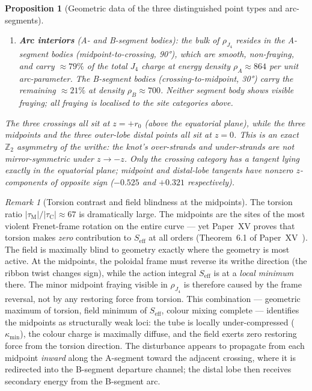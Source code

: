 \documentclass[11pt,a4paper]{article}
\newtheorem{proposition}[theorem]{Proposition}
\theoremstyle{definition}\newtheorem{definition}[theorem]{Definition}
\theoremstyle{remark}
\newtheorem{remark}[theorem]{Remark}
\theoremstyle{definition}\newtheorem{construction}[theorem]{Construction}
\begin{document}
\begin{proposition}[Geometric data of the three distinguished point types and
arc-segments]
\begin{enumerate}[label=(\roman*)]
  shows moderate fraying here, not correlated with $S_{\mathrm{eff}}$,
  $\rho_{J_4}$ extrema, or any arc-segment boundary.
\item \textbf{Arc interiors} (A- and B-segment bodies): the bulk of
  $\rho_{J_4}$ resides in the A-segment bodies (midpoint-to-crossing,
  90°), which are smooth, non-fraying, and carry $\approx79\%$ of the
  total $J_4$ charge at energy density $\rho_A\approx864$ per unit
  arc-parameter.  The B-segment bodies (crossing-to-midpoint, 30°)
  carry the remaining $\approx21\%$ at density $\rho_B\approx700$.
  Neither segment body shows visible fraying; all fraying is localised
  to the site categories above.
\end{enumerate}
The three crossings all sit at $z=+r_0$ (above the equatorial plane),
while the three midpoints and the three outer-lobe distal points all
sit at $z=0$.  This is an exact $\mathbb{Z}_2$ asymmetry of the writhe:
the knot's over-strands and under-strands are not mirror-symmetric
under $z\to -z$.  Only the crossing category has a tangent lying exactly
in the equatorial plane; midpoint and distal-lobe tangents have nonzero
$z$-components of opposite sign ($-0.525$ and $+0.321$ respectively).
\end{proposition}

\begin{remark}[Torsion contrast and field blindness at the midpoints]
\label{P16:rem:torsion_contrast}
The torsion ratio $|\tau_{\mathrm{M}}|/|\tau_{\mathrm{C}}|\approx67$
is dramatically large.  The midpoints are the sites of the most violent
Frenet-frame rotation on the entire curve --- yet Paper~XV proves that
torsion makes \emph{zero} contribution to $S_{\mathrm{eff}}$ at all orders
(Theorem~6.1 of Paper~XV~\cite{Paper15}).  The field
is maximally blind to geometry exactly where the geometry is most active. At
the midpoints, the poloidal frame must reverse its writhe direction (the ribbon
twist changes sign), while the action integral $S_{\mathrm{eff}}$ is at a
\emph{local minimum} there.  The minor midpoint fraying visible in 
$\rho_{J_4}$ is therefore caused by the frame reversal, not by any restoring
force from torsion. This combination --- geometric maximum of torsion, field
minimum of $S_{\mathrm{eff}}$, colour mixing complete --- identifies the
midpoints as structurally weak loci: the tube is locally under-compressed
($\kappa_{\min}$), the colour charge is maximally diffuse, and the field
exerts zero restoring force from the torsion direction. The disturbance appears
to propagate from each midpoint \emph{inward} along the A-segment
toward the adjacent crossing, where it is redirected into the
B-segment departure channel; the distal lobe then receives secondary
energy from the B-segment arc.
\end{remark}
\end{document}
